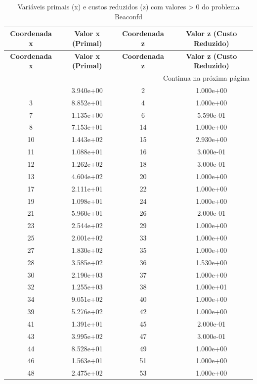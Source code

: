 \documentclass[12pt]{article}
\begin{document}
\begin{longtable}{@{}cccc@{}}
\caption{Variáveis primais (x) e custos reduzidos (z) com valores > 0 do problema Beaconfd} \\
\toprule
\textbf{Coordenada x} & \textbf{Valor x (Primal)} & \textbf{Coordenada z} & \textbf{Valor z (Custo Reduzido)} \\
\midrule
\endfirsthead

\toprule
\textbf{Coordenada x} & \textbf{Valor x (Primal)} & \textbf{Coordenada z} & \textbf{Valor z (Custo Reduzido)} \\
\midrule
\endhead

\midrule \multicolumn{4}{r}{{Continua na próxima página}} \\ \midrule
\endfoot

\bottomrule
\endlastfoot
1 & 3.940e+00 & 2 & 1.000e+00 \\
3 & 8.852e+01 & 4 & 1.000e+00 \\
7 & 1.135e+00 & 6 & 5.590e-01 \\
8 & 7.153e+01 & 14 & 1.000e+00 \\
10 & 1.443e+02 & 15 & 2.930e+00 \\
11 & 1.088e+01 & 16 & 3.000e-01 \\
12 & 1.262e+02 & 18 & 3.000e-01 \\
13 & 4.604e+02 & 20 & 1.000e+00 \\
17 & 2.111e+01 & 22 & 1.000e+00 \\
19 & 1.098e+01 & 24 & 1.000e+00 \\
21 & 5.960e+01 & 26 & 2.000e-01 \\
23 & 2.544e+02 & 29 & 1.000e+00 \\
25 & 2.001e+02 & 33 & 1.000e+00 \\
27 & 1.830e+02 & 35 & 1.000e+00 \\
28 & 3.585e+02 & 36 & 1.530e+00 \\
30 & 2.190e+03 & 37 & 1.000e+00 \\
32 & 1.255e+03 & 38 & 1.000e+01 \\
34 & 9.051e+02 & 40 & 1.000e+00 \\
39 & 5.276e+02 & 42 & 1.000e+00 \\
41 & 1.391e+01 & 45 & 2.000e-01 \\
43 & 3.995e+02 & 47 & 3.000e-01 \\
44 & 8.528e+01 & 49 & 1.000e+00 \\
46 & 1.563e+01 & 51 & 1.000e+00 \\
48 & 2.475e+02 & 53 & 1.000e+00 \\

\end{longtable}
\end{document}
